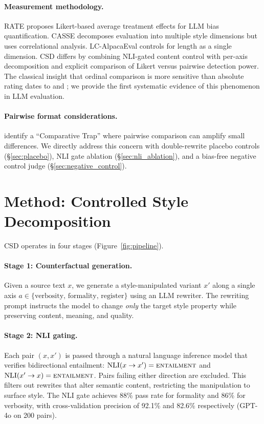 \documentclass[11pt]{article}
\begin{document}
\paragraph{Measurement methodology.}
RATE \citep{ye2024beyond} proposes Likert-based average treatment effects for LLM bias quantification.
CASSE \citep{chen2024casse} decomposes evaluation into multiple style dimensions but uses correlational analysis.
LC-AlpacaEval \citep{dubois2024length} controls for length as a single dimension.
CSD differs by combining NLI-gated content control with per-axis decomposition and explicit comparison of Likert versus pairwise detection power.
The classical insight that ordinal comparison is more sensitive than absolute rating dates to \citet{thurstone1927law} and \citet{stevens1946theory}; we provide the first systematic evidence of this phenomenon in LLM evaluation.

\paragraph{Pairwise format considerations.}
\citet{jeong2025comparative} identify a ``Comparative Trap'' where pairwise comparison can amplify small differences.
We directly address this concern with double-rewrite placebo controls (\S\ref{sec:placebo}), NLI gate ablation (\S\ref{sec:nli_ablation}), and a bias-free negative control judge (\S\ref{sec:negative_control}).

\section{Method: Controlled Style Decomposition}
\label{sec:method}

CSD operates in four stages (Figure~\ref{fig:pipeline}).

\paragraph{Stage 1: Counterfactual generation.}
Given a source text $x$, we generate a style-manipulated variant $x'$ along a single axis $a \in \{\text{verbosity, formality, register}\}$ using an LLM rewriter.
The rewriting prompt instructs the model to change \emph{only} the target style property while preserving content, meaning, and quality.

\paragraph{Stage 2: NLI gating.}
Each pair $(x, x')$ is passed through a natural language inference model that verifies bidirectional entailment: $\text{NLI}(x \rightarrow x') = \textsc{entailment}$ and $\text{NLI}(x' \rightarrow x) = \textsc{entailment}$.
Pairs failing either direction are excluded.
This filters out rewrites that alter semantic content, restricting the manipulation to surface style.
The NLI gate achieves 88\% pass rate for formality and 86\% for verbosity, with cross-validation precision of 92.1\% and 82.6\% respectively (GPT-4o on 200 pairs).
\end{document}
